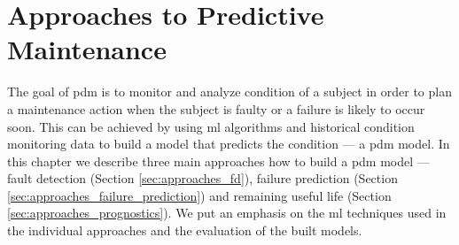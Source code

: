 \chapter{Approaches to Predictive Maintenance}
\label{chapter:approaches}

The goal of \gls{pdm} is to monitor and analyze condition of a subject in order to plan a maintenance action when the subject is faulty or a failure is likely to occur soon.
This can be achieved by using \gls{ml} algorithms and historical condition monitoring data to build a model that predicts the condition --- a \gls{pdm} model.
In this chapter we describe three main approaches how to build a \acrshort{pdm} model --- fault detection (Section \ref{sec:approaches_fd}), failure prediction (Section \ref{sec:approaches_failure_prediction}) and remaining useful life (Section \ref{sec:approaches_prognostics}).
We put an emphasis on the \gls{ml} techniques used in the individual approaches and the evaluation of the built models.







